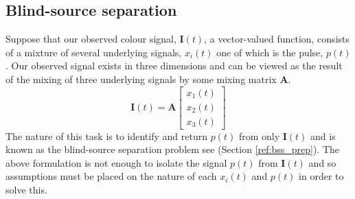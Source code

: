 \subsection{Blind-source separation}
\label{implementation:pca_ica}
Suppose that our observed colour signal, $\mathbf{I}(t)$, a vector-valued function, consists of a mixture of several underlying signals, $x_i(t)$ one of which is the pulse, $p(t)$. 
Our observed signal exists in three dimensions and can be viewed as the result of the mixing of three underlying signals by some mixing matrix $\mathbf{A}$.
\begin{equation*}
    \mathbf{I}(t) = \mathbf{A}\begin{bmatrix} x_1(t) \\ x_2(t) \\ x_3(t) \end{bmatrix}
\end{equation*}
The nature of this task is to identify and return $p(t)$ from only $\mathbf{I}(t)$ and is known as the blind-source separation problem see (Section \ref{ref:bss_prep}).
The above formulation is not enough to isolate the signal $p(t)$ from $\mathbf{I}(t)$ and  so assumptions must be placed on the nature of each $x_i(t)$ and $p(t)$ in order 
to solve this.


